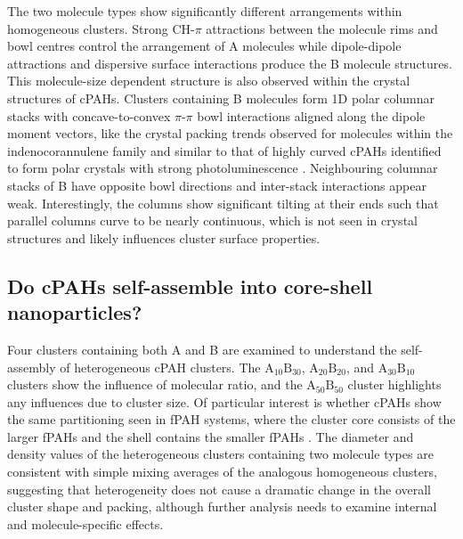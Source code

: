 The two molecule types show significantly different arrangements within homogeneous clusters. Strong CH-$\pi$ attractions between the molecule rims and bowl centres control the arrangement of A molecules while dipole-dipole attractions and dispersive surface interactions produce the B molecule structures. This molecule-size dependent structure is also observed within the crystal structures of cPAHs. Clusters containing B molecules form 1D polar columnar stacks with concave-to-convex $\pi$-$\pi$ bowl interactions aligned along the dipole moment vectors, like the crystal packing trends observed for molecules within the indenocorannulene family \cite{Filatov2010} and similar to that of highly curved cPAHs identified to form polar crystals with strong photoluminescence \cite{chen2014highly}. Neighbouring columnar stacks of B have opposite bowl directions and inter-stack interactions appear weak. Interestingly, the columns show significant tilting at their ends such that parallel columns curve to be nearly continuous, which is not seen in crystal structures and likely influences cluster surface properties.
%
\subsection{Do cPAHs self-assemble into core-shell nanoparticles?} 
Four clusters containing both A and B are examined to understand the self-assembly of heterogeneous cPAH clusters. The $\text{A}_{\text{10}}\text{B}_{\text{30}}$, $\text{A}_{\text{20}}\text{B}_{\text{20}}$, and  $\text{A}_{\text{30}}\text{B}_{\text{10}}$ clusters show the influence of molecular ratio, and the $\text{A}_{\text{50}}\text{B}_{\text{50}}$ cluster highlights any influences due to cluster size. Of particular interest is whether cPAHs show the same partitioning seen in fPAH systems, where the cluster core consists of the larger fPAHs and the shell contains the smaller fPAHs \cite{bowal2018partitioning}. The diameter and density values of the heterogeneous clusters containing two molecule types are consistent with simple mixing averages of the analogous homogeneous clusters, suggesting that heterogeneity does not cause a dramatic change in the overall cluster shape and packing, although further analysis needs to examine internal and molecule-specific effects.

